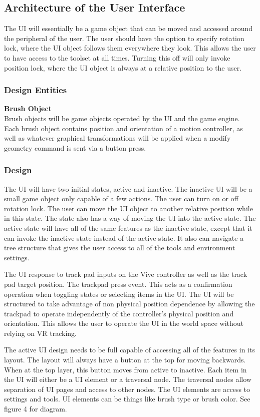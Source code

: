 \documentclass[onecolumn, draftclsnofoot,10pt, compsoc]{IEEEtran}
\begin{document}
\subsection{Architecture of the User Interface}
The UI will essentially be a game object that can be moved and accessed around the peripheral of the user. The user should have the option to specify rotation lock, where the UI object follows them everywhere they look. This allows the user to have access to the toolset at all times. Turning this off will only invoke position lock, where the UI object is always at a relative position to the user. 

\subsubsection{Design Entities}
\textbf{Brush Object} \\
Brush objects will be game objects operated by the UI and the game engine. Each brush object contains position and orientation of a motion controller, as well as whatever graphical transformations will be applied when a modify geometry command is sent via a button press.

\subsubsection{Design}
The UI will have two initial states, active and inactive. The inactive UI will be a small game object only capable of a few actions. The user can turn on or off rotation lock. The user can move the UI object to another relative position while in this state. The state also has a way of moving the UI into the active state. 
The active state will have all of the same features as the inactive state, except that it can invoke the inactive state instead of the active state. It also can navigate a tree structure that gives the user access to all of the tools and environment settings. 

The UI response to track pad inputs on the Vive controller as well as the track pad target position. The trackpad press event. This acts as a confirmation operation when toggling states or selecting items in the UI. The UI will be structured to take advantage of non physical position dependence by allowing the trackpad to operate independently of the controller's physical position and orientation. This allows the user to operate the UI in the world space without relying on VR tracking.

The active UI design needs to be full capable of accessing all of the features in its layout. The layout will always have a button at the top for moving backwards. When at the top layer, this button moves from active to inactive. Each item in the UI will either be a UI element or a traversal node. The traversal nodes allow separation of UI pages and access to other nodes. The UI elements are access to settings and tools. UI elements can be things like brush type or brush color. See figure 4 for diagram.
\end{document}
